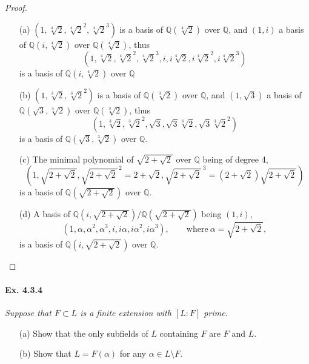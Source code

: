 \documentclass[11pt,a4paper]{article}
\newcommand{\Q}{\mathbb{Q}}
\begin{document}
\begin{proof}
\begin{enumerate}
\item[(a)]
$(1,\sqrt[4]{2},\sqrt[4]{2}^2,\sqrt[4]{2}^3)$ is a basis of $\Q(\sqrt[4]{2})$ over $\Q$, and $(1,i)$ a basis of $\Q(i,\sqrt[4]{2})$ over $\Q(\sqrt[4]{2})$, thus
$$(1,\sqrt[4]{2},\sqrt[4]{2}^2,\sqrt[4]{2}^3, i, i\sqrt[4]{2},i\sqrt[4]{2}^2,i\sqrt[4]{2}^3)$$
is a basis of $\Q(i,\sqrt[4]{2})$ over $\Q$

\item[(b)]
$(1,\sqrt[3]{2},\sqrt[3]{2}^2)$ is a basis of $\Q(\sqrt[3]{2})$ over $\Q$, and $(1,\sqrt{3})$ a basis of $\Q(\sqrt{3},\sqrt[3]{2})$ over $\Q(\sqrt[3]{2})$, thus
$$ ( 1,\sqrt[3]{2},\sqrt[3]{2}^2, \sqrt{3},\sqrt{3}\sqrt[3]{2},\sqrt{3}\sqrt[3]{2}^2)$$
is a basis of $\Q(\sqrt{3},\sqrt[3]{2})$ over $\Q$.

\item[(c)] The minimal polynomial of $\sqrt{2+\sqrt{2}}$ over $\Q$ being of degree 4, 
$$\left(1,\sqrt{2+\sqrt{2}},\sqrt{2+\sqrt{2}}^{\, 2}= 2+\sqrt{2}, \sqrt{2+\sqrt{2}}^{\, 3} =(2+\sqrt{2})\sqrt{2+\sqrt{2}} \right)$$
is a basis of $\Q\left(\sqrt{2+\sqrt{2}}\right)$ over $\Q$.

\item[(d)]
A basis of $\Q\left(i,\sqrt{2+\sqrt{2}}\right)/ \Q\left(\sqrt{2+\sqrt{2}}\right)$ being $(1,i)$, 
$$(1,\alpha,\alpha^2,\alpha^3,i,i\alpha,i\alpha^2,i\alpha^3),\qquad \mathrm{where}\ \alpha = \sqrt{2+\sqrt{2}},$$
is a basis of $\Q\left(i,\sqrt{2+\sqrt{2}}\right)$ over $\Q$.

\end{enumerate}
\end{proof}

\paragraph{Ex. 4.3.4}

{\it Suppose that $F\subset L$ is a finite extension with $[L:F]$ prime.
\begin{enumerate}
\item[(a)] Show that the only subfields of $L$ containing $F$ are $F$ and $L$.
\item[(b)] Show that $L = F(\alpha)$ for any $\alpha \in L \setminus F$.
\end{enumerate}
}
\end{document}

